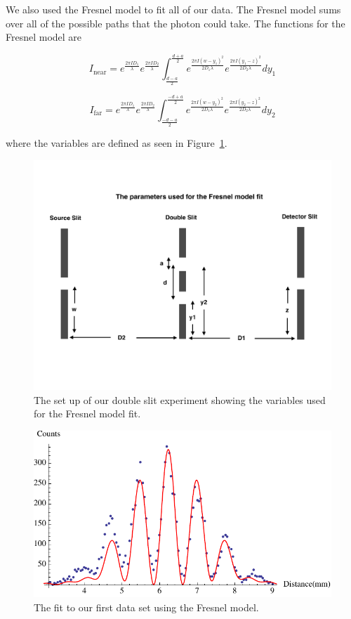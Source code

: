 \documentclass[prb,preprint]{revtex4-1}
\begin{document}
We also used the Fresnel model to fit all of our data. The Fresnel model sums over all of the possible paths that the photon could take. The functions for the Fresnel model are

\begin{equation}
\label{fresnelnear}
I_\text{near} = e^{\frac{2 \pi I D_1}{\lambda}} e^{\frac{2 \pi I D_2}{\lambda}} \int_\frac{d-a}{2}^\frac{d+a}{2} e^{\frac{2 \pi I (w-y_1)^2}{2 D_1 \lambda}} e^{\frac{2 \pi I (y_1-z)^2}{2 D_2 \lambda}} dy_1
\end{equation}

\begin{equation}
\label{fresnelfar}
I_\text{far} = e^{\frac{2 \pi I D_1}{\lambda}} e^{\frac{2 \pi I D_2}{\lambda}} \int_\frac{-d-a}{2}^\frac{-d+a}{2} e^{\frac{2 \pi I (w-y_2)^2}{2 D_1 \lambda}} e^{\frac{2 \pi I (y_2-z)^2}{2 D_2 \lambda}} dy_2
\end{equation}

where the variables are defined as seen in Figure~\ref{fresnelsetup}.

\begin{figure}[h!]
\centering
\includegraphics[width=6in]{fresnelsetup.pdf}
\caption{The set up of our double slit experiment showing the variables used for the Fresnel model fit.}
\label{fresnelsetup}
\end{figure}

\begin{figure}[h!]
\centering
\includegraphics[width=6in]{doublefresnel1.pdf}
\caption{The fit to our first data set using the Fresnel model.}
\label{doublefresnel1}
\end{figure}
\end{document}
